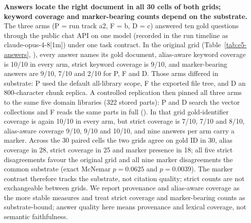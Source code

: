 \textbf{Answers locate the right document in all 30 cells of both grids;
keyword coverage and marker-bearing counts depend on the substrate.}
The three arms (P = run track a2, F = b, D = c) answered ten gold questions
through the public chat API on one model (recorded in the run timeline as
claude-opus-4-8[1m]) under one task contract.
In the original grid (Table~\ref{tab:e5-answers},
), every answer names its gold document,
alias-aware keyword coverage is 10/10 in every arm, strict keyword coverage is
9/10, and marker-bearing answers are 9/10, 7/10 and 2/10 for P, F and D. Those arms differed in substrate: P used the default all-library scope, F
the exported file tree, and D an 800-character chunk replica. A controlled
replication then pinned all three arms to the same five domain libraries (322
stored parts): P and D search the vector collections and F reads the same
parts in full (). In that grid gold-identifier
coverage is again 10/10 in every arm, but strict coverage is 7/10, 7/10 and
8/10, alias-aware coverage 9/10, 9/10 and 10/10, and nine answers per arm
carry a marker. Across the 30 paired cells the two grids agree on gold ID
in 30, alias coverage in 28, strict coverage in 25 and marker presence in 18;
all five strict disagreements favour the original grid and all nine marker
disagreements the common substrate (exact McNemar $p=0.0625$ and
$p=0.0039$). The marker contrast therefore tracks the substrate, not citation
quality; strict counts are not exchangeable between grids. We report
provenance and alias-aware coverage as the more stable measures and treat
strict coverage and marker-bearing counts as substrate-bound; answer quality here means
provenance and lexical coverage, not semantic faithfulness.

